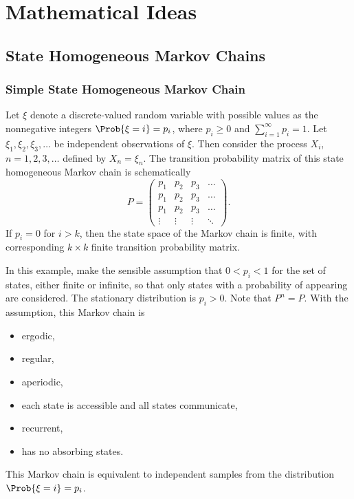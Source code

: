 \documentclass[12pt]{article}
\begin{document}
\section*{Mathematical Ideas}

\subsection*{State Homogeneous Markov Chains}

\subsubsection*{Simple State Homogeneous Markov Chain}

Let \( \xi \) denote a discrete-valued random variable with possible
values as the nonnegative integers \( \Prob{\xi=i} = p_i \), where \( p_i
\ge 0 \) and \( \sum_{i=1}^{\infty} p_i = 1 \).  Let \( \xi_1, \xi_2,
\xi_3, \dots \) be independent observations of \( \xi \).  Then consider
the process \( X_i \), \( n = 1, 2, 3, \dots \) defined by \( X_n = \xi_n
\).  The transition probability matrix of this state homogeneous Markov
chain is schematically%
\[
    P =
    \begin{pmatrix}
        p_1 & p_2 & p_3 & \dots \\
        p_1 & p_2 & p_3 & \dots \\
        p_1 & p_2 & p_3 & \dots \\
        \vdots & \vdots & \vdots & \ddots
    \end{pmatrix}
    .
\] If \( p_i = 0 \) for \( i > k \), then the state space of the Markov
chain is finite, with corresponding \( k \times k \) finite transition
probability matrix.

In this example, make the sensible assumption that \( 0 < p_i < 1 \) for
the set of states, either finite or infinite, so that only states with a
probability of appearing are considered.  The stationary distribution is
\( p_i > 0 \).  Note that \( P^n = P \).  With the assumption, this
Markov chain is
\begin{itemize}
    \item
        ergodic,
    \item
        regular,
    \item
        aperiodic,
    \item
        each state is accessible and all states communicate,
    \item
        recurrent,
    \item
        has no absorbing states.
\end{itemize}
This Markov chain is equivalent to independent samples from the
distribution \( \Prob{\xi=i} = p_i \).
\end{document}

